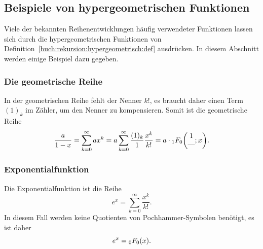 %
%
\subsection{Beispiele von hypergeometrischen Funktionen
\label{buch:rekursion:hypergeometrisch:beispiele}}
Viele der bekannten Reihenentwicklungen häufig verwendeter Funktionen
lassen sich durch die hypergeometrischen Funktionen von
Definition~\ref{buch:rekursion:hypergeometrisch:def} ausdrücken.
In diesem Abschnitt werden einige Beispiel dazu gegeben.

%
%
\subsubsection{Die geometrische Reihe}
In der geometrischen Reihe fehlt der Nenner $k!$, es braucht
daher einen Term $(1)_k$ im Zähler, um den Nenner zu kompensieren.
Somit ist die geometrische Reihe
\[
\frac{a}{1-x}
=
\sum_{k=0}^\infty
ax^k
=
a\sum_{k=0}^\infty
\frac{(1)_k}{1}
\frac{x^k}{k!}
=
a\cdot\mathstrut_1F_0\biggl(\begin{matrix}1\\\text{---}\end{matrix};x\biggr).
\]

%
%
\subsubsection{Exponentialfunktion}
%
Die Exponentialfunktion ist die Reihe
\[
e^x = \sum_{k=0}^\infty \frac{x^k}{k!}.
\]
In diesem Fall werden keine Quotienten von Pochhammer-Symbolen
benötigt, es ist daher
\[
e^x = \mathstrut_0F_0(x).
\]

%
%
